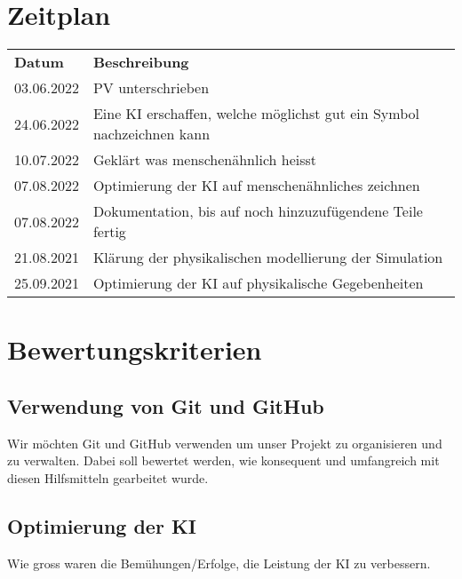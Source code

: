 \documentclass{article}
\begin{document}
\section{Zeitplan}
\label{chap:zeitplan}
\begin{table}[H]
    \begin{tabular}{ll}
    \textbf{Datum} & \textbf{Beschreibung}                                                                         \\
    03.06.2022     & PV unterschrieben                                                                             \\
    24.06.2022     & Eine KI erschaffen, welche möglichst gut ein Symbol nachzeichnen kann                         \\
    10.07.2022     & Geklärt was menschenähnlich heisst                                                            \\
    07.08.2022     & Optimierung der KI auf menschenähnliches zeichnen                                             \\
    07.08.2022     & Dokumentation, bis auf noch hinzuzufügendene Teile fertig                                     \\
    21.08.2021     & Klärung der physikalischen modellierung der Simulation                                        \\
    25.09.2021     & Optimierung der KI auf physikalische Gegebenheiten                                            \\
    \end{tabular}
\end{table}

\section{Bewertungskriterien}
\subsection{Verwendung von Git und GitHub}
\label{chap:git_github}
Wir möchten Git und GitHub verwenden um unser Projekt zu organisieren und zu verwalten. 
Dabei soll bewertet werden, wie konsequent und umfangreich mit diesen Hilfsmitteln gearbeitet wurde.

\subsection{Optimierung der KI}
\label{chap:optimierung}
Wie gross waren die Bemühungen/Erfolge, die Leistung der KI zu verbessern.
\end{document}
